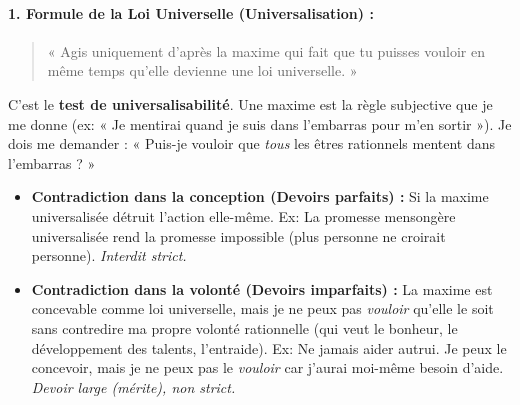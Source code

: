 \documentclass[11pt]{article}
\newcommand{\cle}[1]{{\popxbold\color{popdark}#1}}
\begin{document}
\paragraph{1. Formule de la Loi Universelle (Universalisation) :}
\begin{quote}
« Agis uniquement d'après la maxime qui fait que tu puisses vouloir en même temps qu'elle devienne une loi universelle. »
\end{quote}
C'est le \textbf{test de universalisabilité}. Une \cle{maxime} est la règle subjective que je me donne (ex: « Je mentirai quand je suis dans l'embarras pour m'en sortir »). Je dois me demander : « Puis-je vouloir que \emph{tous} les êtres rationnels mentent dans l'embarras ? »
\begin{itemize}
    \item \textbf{Contradiction dans la conception (Devoirs parfaits) :} Si la maxime universalisée détruit l'action elle-même. Ex: La promesse mensongère universalisée rend la promesse impossible (plus personne ne croirait personne). \emph{Interdit strict.}
    \item \textbf{Contradiction dans la volonté (Devoirs imparfaits) :} La maxime est concevable comme loi universelle, mais je ne peux pas \emph{vouloir} qu'elle le soit sans contredire ma propre volonté rationnelle (qui veut le bonheur, le développement des talents, l'entraide). Ex: Ne jamais aider autrui. Je peux le concevoir, mais je ne peux pas le \emph{vouloir} car j'aurai moi-même besoin d'aide. \emph{Devoir large (mérite), non strict.}
\end{itemize}
\end{document}
